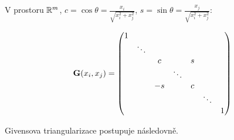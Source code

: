 \noindent V prostoru $\mathbb{R}^m$, $c = \cos\theta = \frac{x_i}{\sqrt{x_i^2 + x_j^2}}$, $s = \sin\theta = \frac{x_j}{\sqrt{x_i^2 + x_j^2}}$:

\[ \mathbf{G}(x_i,x_j) = \begin{pmatrix} 1      &        &          &        &         &        &    \\ & \ddots &          &        &         &        &    \\ &        &  c       &        &  s      &        &    \\ &        &          & \ddots &         &        &    \\ &        &  -s      &        &  c      &        &    \\ &        &          &        &         & \ddots &    \\ &        &          &        &         &        & 1 \end{pmatrix} \]

\noindent Givensova triangularizace postupuje následovně.

